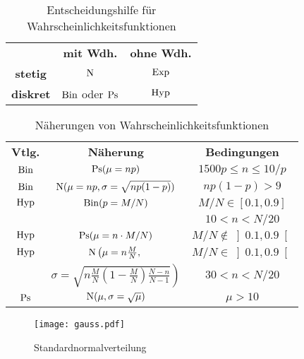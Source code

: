 \begin{table}[htb]
\centering
\begin{tabular}{ccc}
  & \bfseries mit Wdh.
  & \bfseries ohne Wdh. \\
\bfseries stetig
  & $\operatorname{N}$
  & $\operatorname{Exp}$ \\
\bfseries diskret
  & $\operatorname{Bin}$ oder $\operatorname{Ps}$
  & $\operatorname{Hyp}$ \\
\end{tabular}
\caption{Entscheidungshilfe für Wahrscheinlichkeitsfunktionen}
\end{table}


\begin{table}[htb]
\centering
\def\arraystretch{1.5}
\begin{tabular}{ccc}
\bfseries Vtlg. & \bfseries Näherung & \bfseries Bedingungen \\
$\operatorname{Bin}$          & $\operatorname{Ps}(\mu = np)$    & $1500p \leq n \leq 10/p$ \\
\hline
$\operatorname{Bin}$          & $\operatorname{N}(\mu=np,\sigma=\sqrt{np(1-p)})$ & $np(1-p)>9$ \\
\hline
$\operatorname{Hyp}$          & $\operatorname{Bin}(p=M/N)$      & $M/N \in [0.1, 0.9]$ \\
                &                    & $10 < n < N/20$ \\
\hline
$\operatorname{Hyp}$          & $\operatorname{Ps}(\mu = n\cdot M/N)$ & $M/N \notin \left]0.1,0.9\right[$ \\
\hline
$\operatorname{Hyp}$          & $\operatorname{N}\left(\mu=n\frac{M}{N},\right.$ & $M/N \in \left]0.1,0.9\right[$ \\
                & $\left.\sigma=\sqrt{n\frac{M}{N}\left(1-\frac{M}{N}\right)\frac{N-n}{N-1}}\right)$ & $30 < n < N/20$ \\
\hline
$\operatorname{Ps}$           & $\operatorname{N}(\mu, \sigma=\sqrt{\mu})$ & $\mu>10$
\end{tabular}

\caption{Näherungen von Wahrscheinlichkeitsfunktionen}
\end{table}

\begin{figure}[htb]
\centering\texttt{[image: gauss.pdf]}

\caption{Standardnormalverteilung}
\end{figure}
